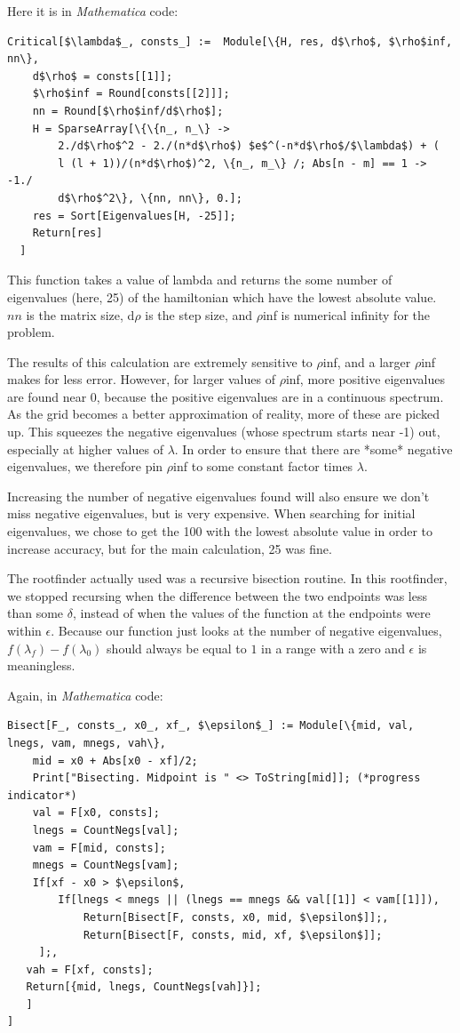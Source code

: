 \documentclass[12pt,twoside]{reedthesis}
\begin{document}
Here it is in \emph{Mathematica} code:
\begin{Verbatim}[commandchars=\\\{\}, codes={\catcode`$=3}]
Critical[$\lambda$_, consts_] :=  Module[\{H, res, d$\rho$, $\rho$inf, nn\},
    d$\rho$ = consts[[1]];
    $\rho$inf = Round[consts[[2]]];
    nn = Round[$\rho$inf/d$\rho$];
    H = SparseArray[\{\{n_, n_\} -> 
        2./d$\rho$^2 - 2./(n*d$\rho$) $e$^(-n*d$\rho$/$\lambda$) + (
        l (l + 1))/(n*d$\rho$)^2, \{n_, m_\} /; Abs[n - m] == 1 -> -1./
        d$\rho$^2\}, \{nn, nn\}, 0.];
    res = Sort[Eigenvalues[H, -25]];
    Return[res]
  ]
\end{Verbatim}
This function takes a value of lambda and returns the some number of eigenvalues (here, 25)  of the hamiltonian which have the lowest absolute value. $nn$ is the matrix size, d$\rho$ is the step size, and $\rho$inf is numerical infinity for the problem.

The results of this calculation are extremely sensitive to $\rho$inf, and a larger $\rho$inf makes for less error. However, for larger values of $\rho$inf, more positive eigenvalues are found near 0, because the positive eigenvalues are in a continuous spectrum. As the grid becomes a better approximation of reality, more of these are picked up. This squeezes the negative eigenvalues (whose spectrum starts near -1) out, especially at higher values of $\lambda$. In order to ensure that there are *some* negative eigenvalues, we therefore pin $\rho$inf to some constant factor times $\lambda$. 

Increasing the number of negative eigenvalues found will also ensure we don't miss negative eigenvalues, but is very expensive. When searching for initial eigenvalues, we chose to get the 100 with the lowest absolute value in order to increase accuracy, but for the main calculation, 25 was fine.

The rootfinder actually used was a recursive bisection routine. In this rootfinder, we stopped recursing when the difference between the two endpoints was less than some $\delta$, instead of when the values of the function at the endpoints were within $\epsilon$. Because our function just looks at the number of negative eigenvalues, $f(\lambda_f) - f(\lambda_0)$ should always be equal to $1$ in a range with a zero and $\epsilon$ is meaningless. 

Again, in \emph{Mathematica} code:

\begin{Verbatim}[commandchars=\\\{\}, codes={\catcode`$=3}]
Bisect[F_, consts_, x0_, xf_, $\epsilon$_] := Module[\{mid, val, lnegs, vam, mnegs, vah\},
    mid = x0 + Abs[x0 - xf]/2;
    Print["Bisecting. Midpoint is " <> ToString[mid]]; (*progress indicator*)
    val = F[x0, consts];
    lnegs = CountNegs[val];
    vam = F[mid, consts];
    mnegs = CountNegs[vam];
    If[xf - x0 > $\epsilon$,
        If[lnegs < mnegs || (lnegs == mnegs && val[[1]] < vam[[1]]), 
            Return[Bisect[F, consts, x0, mid, $\epsilon$]];, 
            Return[Bisect[F, consts, mid, xf, $\epsilon$]]; 
     ];,
   vah = F[xf, consts];
   Return[{mid, lnegs, CountNegs[vah]}];
   ]
]
\end{Verbatim}
\end{document}
